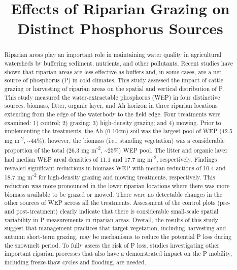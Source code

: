 \documentclass[
]{agujournal2019}
\begin{document}
\title{Effects of Riparian Grazing on Distinct Phosphorus Sources}



\begin{abstract}
Riparian areas play an important role in maintaining water quality in
agricultural watersheds by buffering sediment, nutrients, and other
pollutants. Recent studies have shown that riparian areas are less
effective as buffers and, in some cases, are a net source of phosphorus
(P) in cold climates. This study assessed the impact of cattle grazing
or harvesting of riparian areas on the spatial and vertical distribution
of P. This study measured the water-extractable phosphorus (WEP) in four
distinctive sources: biomass, litter, organic layer, and Ah horizon in
three riparian locations extending from the edge of the waterbody to the
field edge. Four treatments were examined: 1) control; 2) grazing; 3)
high-density grazing; and 4) mowing. Prior to implementing the
treatments, the Ah (0-10cm) soil was the largest pool of WEP (42.5 mg
m\textsuperscript{-2}, \textasciitilde44\%); however, the biomass (i.e.,
standing vegetation) was a considerable proportion of the total (26.3 mg
m\textsuperscript{-2}, \textasciitilde25\%) WEP pool. The litter and
organic layer had median WEP areal densities of 11.1 and 17.7 mg
m\textsuperscript{-2}, respectively. Findings revealed significant
reductions in biomass WEP with median reductions of 10.4 and 18.7 mg
m\textsuperscript{-2} for high-density grazing and mowing treatments,
respectively. This reduction was more pronounced in the lower riparian
locations where there was more biomass available to be grazed or mowed.
There were no detectable changes in the other sources of WEP across all
the treatments. Assessment of the control plots (pre- and
post-treatment) clearly indicate that there is considerable small-scale
spatial variability in P measurements in riparian areas. Overall, the
results of this study suggest that management practices that target
vegetation, including harvesting and autumn short-term grazing, may be
mechanisms to reduce the potential P loss during the snowmelt period. To
fully assess the risk of P loss, studies investigating other important
riparian processes that also have a demonstrated impact on the P
mobility, including freeze-thaw cycles and flooding, are needed.
\end{abstract}
\end{document}

